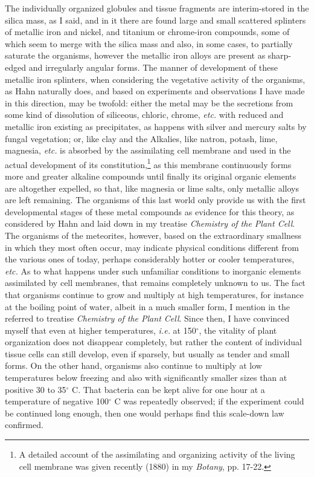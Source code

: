 \documentclass[a4paper, 12pt, oneside]{article}
\begin{document}
The individually organized globules and tissue fragments are interim-stored in the silica mass, as I said, and in it there are found large and small scattered splinters of metallic iron and nickel, and titanium or chrome-iron compounds, some of which seem to merge with the silica mass and also, in some cases, to partially saturate the organisms, however the metallic iron alloys are present as sharp-edged and irregularly angular forms. The manner of development of these metallic iron splinters, when considering the vegetative activity of the organisms, as Hahn naturally does, and based on experiments and observations I have made in this direction, may be twofold: either the metal may be the secretions from some kind of dissolution of siliceous, chloric, chrome, \emph{etc.} with reduced and metallic iron existing as precipitates, as happens with silver and mercury salts by fungal vegetation; or, like clay and the Alkalies, like natron, potash, lime, magnesia, \emph{etc.} is absorbed by the assimilating cell membrane and used in the actual development of its constitution,\footnote{A detailed account of the assimilating and organizing activity of the living cell membrane was given recently (1880) in my \emph{Botany}, pp. 17-22.} as this membrane continuously forms more and greater alkaline compounds until finally its original organic elements are altogether expelled, so that, like magnesia or lime salts, only metallic alloys are left remaining. The organisms of this last world only provide us with the first developmental stages of these metal compounds as evidence for this theory, as considered by Hahn and laid down in my treatise \emph{Chemistry of the Plant Cell}. The organisms of the meteorites, however, based on the extraordinary smallness in which they most often occur, may indicate physical conditions different from the various ones of today, perhaps considerably hotter or cooler temperatures, \emph{etc.} As to what happens under such unfamiliar conditions to inorganic elements assimilated by cell membranes, that remains completely unknown to us. The fact that organisms continue to grow and multiply at high temperatures, for instance at the boiling point of water, albeit in a much smaller form, I mention in the referred to treatise \emph{Chemistry of the Plant Cell}. Since then, I have convinced myself that even at higher temperatures, \emph{i.e.} at 150$^{\circ}$, the vitality of plant organization does not disappear completely, but rather the content of individual tissue cells can still develop, even if sparsely, but usually as tender and small forms. On the other hand, organisms also continue to multiply at low temperatures below freezing and also with significantly smaller sizes than at positive 30 to 35$^{\circ}$ C. That bacteria can be kept alive for one hour at a temperature of negative 100$^{\circ}$ C was repeatedly observed; if the experiment could be continued long enough, then one would perhaps find this scale-down law confirmed.
\end{document}
